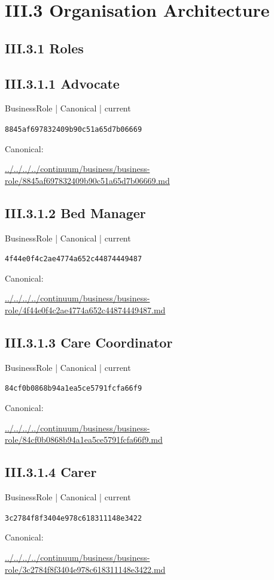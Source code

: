 \documentclass[10pt,a4paper]{article}
\begin{document}
\section*{III.3 Organisation Architecture}
\subsection*{III.3.1 Roles}
\subsection*{III.3.1.1 Advocate}
\label{element-8845af697832409b90c51a65d7b06669}
{\small BusinessRole | Canonical | current}\par
\texttt{8845af697832409b90c51a65d7b06669}\par
Canonical: \par
{\footnotesize\url{../../../../continuum/business/business-role/8845af697832409b90c51a65d7b06669.md}}\par
\subsection*{III.3.1.2 Bed Manager}
\label{element-4f44e0f4c2ae4774a652c44874449487}
{\small BusinessRole | Canonical | current}\par
\texttt{4f44e0f4c2ae4774a652c44874449487}\par
Canonical: \par
{\footnotesize\url{../../../../continuum/business/business-role/4f44e0f4c2ae4774a652c44874449487.md}}\par
\subsection*{III.3.1.3 Care Coordinator}
\label{element-84cf0b0868b94a1ea5ce5791fcfa66f9}
{\small BusinessRole | Canonical | current}\par
\texttt{84cf0b0868b94a1ea5ce5791fcfa66f9}\par
Canonical: \par
{\footnotesize\url{../../../../continuum/business/business-role/84cf0b0868b94a1ea5ce5791fcfa66f9.md}}\par
\subsection*{III.3.1.4 Carer}
\label{element-3c2784f8f3404e978c618311148e3422}
{\small BusinessRole | Canonical | current}\par
\texttt{3c2784f8f3404e978c618311148e3422}\par
Canonical: \par
{\footnotesize\url{../../../../continuum/business/business-role/3c2784f8f3404e978c618311148e3422.md}}\par
\end{document}
